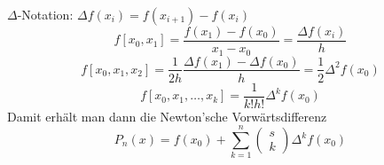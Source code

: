 $\Delta$-Notation: $\Delta f(x_i) = f(x_{i + 1}) - f(x_i)$
\begin{equation}
	f[x_0, x_1] = \frac{f(x_1) - f(x_0)}{x_1 - x_0} = \frac{\Delta f(x_i)}{h}
\end{equation}
\begin{equation}
	f[x_0, x_1, x_2] = \frac{1}{2h} \frac{\Delta f(x_1) - \Delta f(x_0)}{h} = \frac{1}{2} \Delta^2 f(x_0)
\end{equation}
\begin{equation}
	f[x_0, x_1, \ldots, x_k] = \frac{1}{k! h!} \Delta^k f(x_0)
\end{equation}
Damit erhält man dann die Newton'sche Vorwärtsdifferenz
\begin{equation}
	P_n(x) = f(x_0) + \sum_{k = 1}^n \begin{pmatrix} s \\ k \end{pmatrix} \Delta^k f(x_0)
\end{equation}